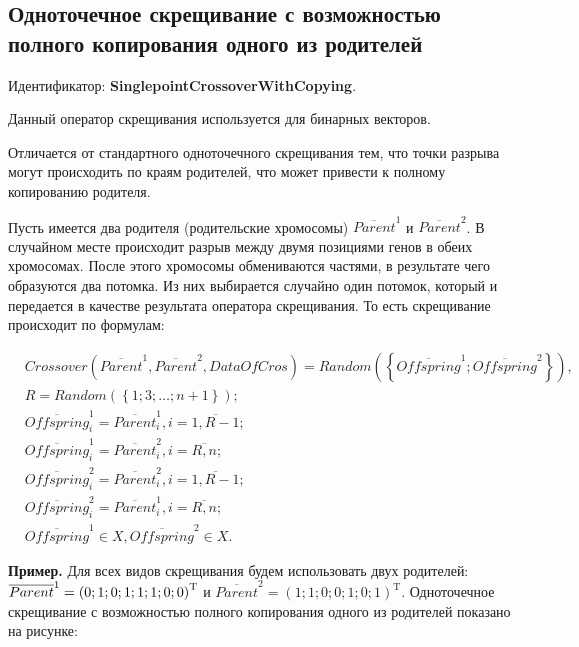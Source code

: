\subsection{Одноточечное скрещивание с возможностью полного копирования одного из родителей}\label{SetOfOperatorsAlgorithms:SinglepointCrossoverWithCopying}

Идентификатор: \textbf{SinglepointCrossoverWithCopying}.

Данный оператор скрещивания используется для бинарных векторов.

Отличается от стандартного одноточечного скрещивания тем, что точки разрыва могут происходить по краям родителей, что может привести к полному копированию родителя.

Пусть имеется два родителя (родительские хромосомы) $ \overline{Parent}^1 $ и $ \overline{Parent}^2$. В случайном месте происходит разрыв между двумя позициями генов в обеих хромосомах. После этого хромосомы обмениваются частями, в результате чего образуются два потомка. Из них выбирается случайно один потомок, который и передается в качестве результата оператора скрещивания. То есть скрещивание происходит по формулам:

\begin{align}
\label{SetOfOperatorsAlgorithms:eq:SinglepointCrossoverWithCopying}
&Crossover \left( \overline{Parent}^1, \overline{Parent}^2, DataOfCros\right)=Random \left(\left\lbrace \overline{Offspring}^1; \overline{Offspring}^2\right\rbrace  \right), \\
&R=Random\left( \left\lbrace 1; 3; \ldots; n+1\right\rbrace \right); \nonumber \\
& \overline{Offspring}^1_i=\overline{Parent}^1_i, i=\overline{1,R-1};\nonumber\\
&  \overline{Offspring}^1_i=\overline{Parent}^2_i, i=\overline{R,n};\nonumber\\
&\overline{Offspring}^2_i=\overline{Parent}^2_i, i=\overline{1,R-1};\nonumber\\
& \overline{Offspring}^2_i=\overline{Parent}^1_i, i=\overline{R,n};\nonumber\\
&\overline{Offspring}^1\in X, \overline{Offspring}^2\in X.\nonumber
\end{align}

\textbf{Пример.} Для всех видов скрещивания будем использовать двух родителей: $\overline{Parent}^1\hmm={\left( 0; 1; 0; 1; 1; 1; 0; 0\right)}^\mathrm{T}  $ и $\overline{Parent}^2={\left( 1; 1; 0; 0; 1; 0; 1\right)}^\mathrm{T}  $. Одноточечное скрещивание с возможностью полного копирования одного из родителей показано на рисунке:

